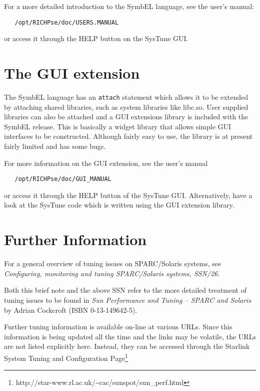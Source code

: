 \documentclass[11pt]{article}
\newcommand{\htmladdnormallinkfoot}[2]{#1\footnote{#2}}
\newcommand{\xref}[3]{#1}
\newcommand{\xlabel}[1]{}
\begin{document}
For a more detailed introduction to the SymbEL language, see the user's
manual:

\begin{verbatim}
   /opt/RICHPse/doc/USERS.MANUAL
\end{verbatim}

or access it through the HELP button on the SysTune GUI.
 
\section{\label{gui}\xlabel{gui}The GUI extension}

The SymbEL language has an {\tt{attach}} statement which allows it to be
extended by attaching shared libraries, such as system libraries like
libc.so. User supplied libraries can also be attached and a GUI extensions
library is included with the SymbEL release. This is basically a widget
library that allows simple GUI interfaces to be constructed. Although
fairly easy to use, the library is at present fairly limited and has some
bugs.

For more information on the GUI extension, see the user's manual

\begin{verbatim}
   /opt/RICHPse/doc/GUI_MANUAL
\end{verbatim}

or access it through the HELP button of the SysTune GUI. Alternatively,
have a look at the SysTune code which is written using the GUI extension
library.

\section{\label{more_info}\xlabel{more_info}Further Information}

For a general overview of tuning issues on SPARC/Solaris systems, see
\xref{{\em{Configuring, monitoring and tuning SPARC/Solaris 
systems}, SSN/26}}{ssn26}{}.

Both this brief note and the above SSN refer to the more detailed treatment
of tuning issues to be found in {\em{Sun Performance and Tuning -- SPARC and
Solaris}} by Adrian Cockcroft (ISBN 0-13-149642-5).

Further tuning information is available on-line at various URLs. Since
this information is being updated all the time and the links may be
volatile, the URLs are not listed explicitly here. Instead, they can be
accessed through \htmladdnormallinkfoot{the Starlink System Tuning and
Configuration Page}{http://star-www.rl.ac.uk/\~{}cac/sunspot/sun\_perf.html}
\end{document}
